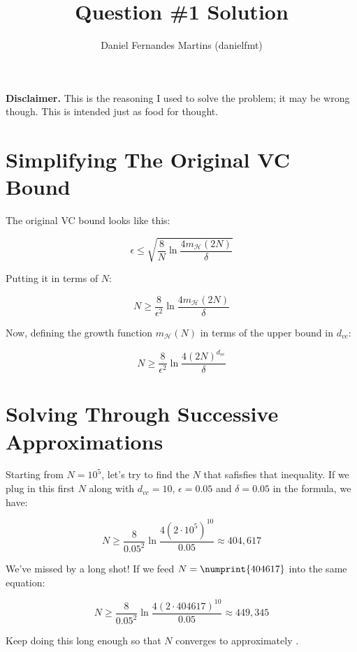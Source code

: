 \documentclass{article}
\author{Daniel Fernandes Martins (danielfmt)}
\title{Question \#1 Solution}
\begin{document}
\maketitle

\textbf{Disclaimer.} This is the reasoning I used to solve the problem; it
may be wrong though. This is intended just as food for thought.

\section{Simplifying The Original VC Bound}

The original VC bound looks like this:

\begin{equation*}
\epsilon \leq \sqrt{\frac{8}{N}\ln{\frac{4m_{\mathcal{H}}(2N)}{\delta}}}
\end{equation*}

Putting it in terms of $N$:

\begin{equation*}
N \geq \frac{8}{\epsilon^2}\ln{\frac{4m_{\mathcal{H}}(2N)}{\delta}}
\end{equation*}

Now, defining the growth function $m_{\mathcal{H}}(N)$ in terms of the upper
bound in $d_{vc}$:

\begin{equation*}
N \geq \frac{8}{\epsilon^2}\ln{\frac{4(2N)^{d_{vc}}}{\delta}}
\end{equation*}

\section{Solving Through Successive Approximations}

Starting from $N=10^5$, let's try to find the $N$ that safisfies that
inequality. If we plug in this first $N$ along with $d_{vc}=10$,
$\epsilon=0.05$ and $\delta=0.05$ in the formula, we have:

\begin{equation*}
N \geq \frac{8}{0.05^2}\ln{\frac{4(2\cdot10^5)^{10}}{0.05}} \approx 404,617
\end{equation*}

We've missed by a long shot! If we feed $N=\numprint{404617}$ into the same
equation:

\begin{equation*}
N \geq \frac{8}{0.05^2}\ln{\frac{4(2\cdot404617)^{10}}{0.05}} \approx 449,345
\end{equation*}

Keep doing this long enough so that $N$ converges to approximately
.
\end{document}
